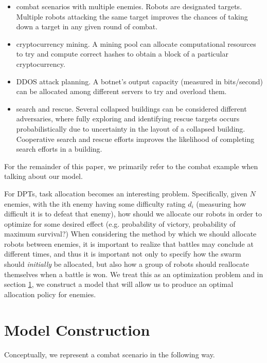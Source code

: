 \documentclass[11pt]{article}
\theoremstyle{definition}
\begin{document}
\begin{itemize}
    \item combat scenarios with multiple enemies.
        Robots are designated targets. Multiple
        robots attacking the same target
        improves the chances of taking down
        a target in any given round of combat.
    \item cryptocurrency mining. A mining pool
        can allocate computational resources to
        try and compute correct hashes to
        obtain a block of a particular
        cryptocurrency.
    \item DDOS attack planning. A botnet's
        output capacity (measured in bits/second)
        can be allocated among different servers
        to try and overload them.
    \item search and rescue. Several collapsed
        buildings can be considered different
        adversaries, where fully exploring
        and identifying rescue targets occurs
        probabilistically due to uncertainty
        in the layout of a collapsed building.
        Cooperative search and rescue efforts improves
        the likelihood of completing search efforts
        in a building.
\end{itemize}

For the remainder of this paper, we primarily
refer to the combat example when talking about
our model.

For DPTs, task allocation becomes an interesting
problem.
Specifically, given $ N $ enemies,
with the ith enemy having some difficulty
rating $d_i$ (measuring how difficult it is
to defeat that enemy), how should we allocate our robots
in order to optimize for some desired effect
(e.g. probability of victory, probability of maximum
survival?)
When considering the method by which we should allocate
robots between enemies, it is important to realize
that battles may conclude at different times, and
thus it is important not only to specify how the
swarm should \emph{initially} be allocated,
but also how a group of robots should reallocate
themselves when a battle is won. We treat this
as an optimization problem and in section
\ref{sec:model}, we construct a model that
will allow us to produce an optimal allocation
policy for enemies.

\section{Model Construction}
\label{sec:model}

Conceptually, we represent a combat scenario in the following way.
\end{document}
